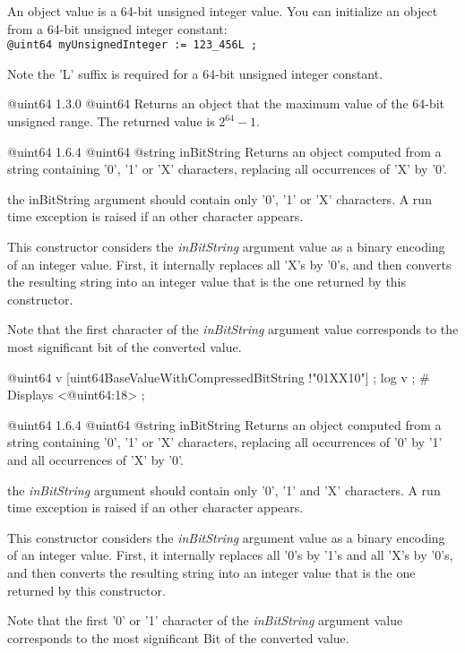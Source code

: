 

An  object value is a 64-bit unsigned integer value. You can initialize an  object from a 64-bit unsigned integer constant:\\

\texttt{@uint64 myUnsignedInteger := 123\_456L ;}\newline

Note the 'L' suffix is required for a 64-bit unsigned integer constant.



{@uint64}
{1.3.0}
{@uint64}
{Returns an  object that the maximum value of the 64-bit unsigned range.}
{The returned value is $2^{64}-1$.}


{@uint64}
{1.6.4}
{@uint64}
{@string inBitString}
{Returns an  object computed from a string containing '0', '1' or 'X' characters, replacing all occurrences of 'X' by '0'.}
{the inBitString argument should contain only '0', '1' or 'X' characters. A run time exception is raised if an other character appears.

This constructor considers the \emph{inBitString} argument value as a binary encoding of an integer value. First, it internally replaces all 'X's by '0's, and then converts the resulting string into an integer value that is the one returned by this constructor.

Note that the first character of the \emph{inBitString} argument value corresponds to the most significant bit of the converted value.}


\exempleDeuxLignes
{}
{@uint64 v [uint64BaseValueWithCompressedBitString !"01XX10"] ;}
{log v ; \# Displays <@uint64:18> ;}





{@uint64}
{1.6.4}
{@uint64}
{@string inBitString}
{Returns an  object computed from a string containing '0', '1' or 'X' characters, replacing all occurrences of '0' by '1' and all occurrences of 'X' by '0'.}
{the \emph{inBitString} argument should contain only '0', '1' and 'X' characters. A run time exception is raised if an other character appears.

This constructor considers the \emph{inBitString} argument value as a binary encoding of an integer value. First, it internally replaces all '0's by '1's and all 'X's by '0's, and then converts the resulting string into an integer value that is the one returned by this constructor.

Note that the first '0' or '1' character of the \emph{inBitString} argument value corresponds to the most significant Bit of the converted value.}

